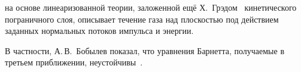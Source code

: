 




на основе линеаризованной теории, заложенной ещё Х.~Грэдом~\cite{Grad1963b}
кинетического пограничного слоя, описывает
течение газа над плоскостью под действием заданных нормальных потоков
импульса и энергии.

В частности, А.\,В.~Бобылев показал,
что уравнения Барнетта, получаемые в третьем приближении, неустойчивы~\cite{Bobylev1982}.


